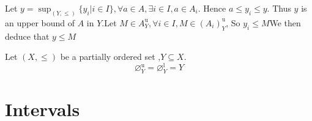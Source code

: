 \documentclass{book}
\numberwithin{equation}{section}
\begin{document}
\begin{proofenv}
    Let $y=\sup_{(Y,\le)}\{y_i|i\in I\},\forall a\in A ,\exists i\in I,a\in A_i$. Hence $a\le y_i\le y$. Thus $y $ is an upper bound of $A$ in $Y$.Let $M\in A_Y^\mathrm{u},\forall i \in I,M\in (A_i)_Y^\mathrm{u}$, So $y_i \le M $We then deduce that $y\le M$
\end{proofenv}
\begin{propositionenv}
    Let $(X,\le)$ be a partially ordered set ,$Y\subseteq X$.$$\varnothing_Y^\mathrm{u}=\varnothing_Y^\mathrm{l}=Y$$
\end{propositionenv}


\section{Intervals}
\end{document}
